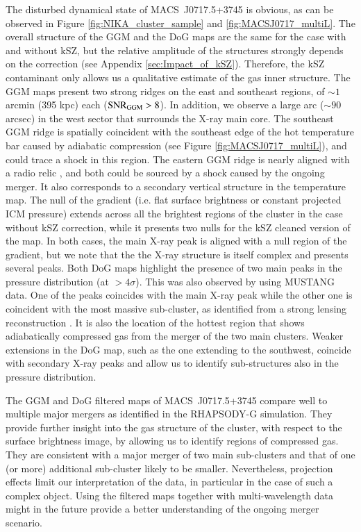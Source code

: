 \documentclass[twocolumn,traditabstract]{aa}
\begin{document}
The disturbed dynamical state of \mbox{MACS~J0717.5+3745} is obvious, as can be observed in Figure \ref{fig:NIKA_cluster_sample} and \ref{fig:MACSJ0717_multiL}. The overall structure of the GGM and the DoG maps are the same for the case with and without kSZ, but the relative amplitude of the structures strongly depends on the correction (see Appendix \ref{sec:Impact_of_kSZ}). Therefore, the kSZ contaminant only allows us a qualitative estimate of the gas inner structure. The GGM maps present two strong ridges on the east and southeast regions, of $\sim 1$ arcmin (395 kpc) each (${\rm SNR}_{\rm GGM} > 8$). In addition, we observe a large arc ($\sim 90$ arcsec) in the west sector that surrounds the X-ray main core. The southeast GGM ridge is spatially coincident with the southeast edge of the hot temperature bar caused by adiabatic compression (see Figure \ref{fig:MACSJ0717_multiL}), and could trace a shock in this region. The eastern GGM ridge is nearly aligned with a radio relic \citep[see, e.g.][]{vanWeeren2017}, and both could be sourced by a shock caused by the ongoing merger. It also corresponds to a secondary vertical structure in the temperature map. The null of the gradient (i.e. flat surface brightness or constant projected ICM pressure) extends across all the brightest regions of the cluster in the case without kSZ correction, while it presents two nulls for the kSZ cleaned version of the map. In both cases, the main X-ray peak is aligned with a null region of the gradient, but we note that the the X-ray structure is itself complex and presents several peaks. Both DoG maps highlight the presence of two main peaks in the pressure distribution (at $> 4 \sigma$). This was also observed by \cite{Mroczkowski2012} using MUSTANG data. One of the peaks coincides with the main X-ray peak while the other one is coincident with the most massive sub-cluster, as identified from a strong lensing reconstruction \citep[e.g.][]{Limousin2015}. It is also the location of the hottest region that shows adiabatically compressed gas from the merger of the two main clusters. Weaker extensions in the DoG map, such as the one extending to the southwest, coincide with secondary X-ray peaks and allow us to identify sub-structures also in the pressure distribution.

The GGM and DoG filtered maps of \mbox{MACS~J0717.5+3745} compare well to multiple major mergers as identified in the RHAPSODY-G simulation. They provide further insight into the gas structure of the cluster, with respect to the surface brightness image, by allowing us to identify regions of compressed gas. They are consistent with a major merger of two main sub-clusters and that of one (or more) additional sub-cluster likely to be smaller. Nevertheless, projection effects limit our interpretation of the data, in particular in the case of such a complex object. Using the filtered maps together with multi-wavelength data might in the future provide a better understanding of the ongoing merger scenario.
\end{document}
